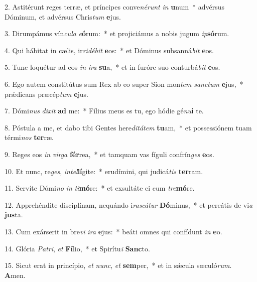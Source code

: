 2. Astitérunt reges terræ, et príncipes conve\textit{né}\textit{runt} \textit{in} \textbf{u}num~*  advérsus Dóminum, et advérsus Chris\textit{tum} \textbf{e}jus.\

3. Dirumpámus vín\textit{cu}\textit{la} \textit{e}\textbf{ó}rum:~*  et projiciámus a nobis jugum \textit{ip}\textbf{só}rum.\

4. Qui hábitat in cælis, ir\textit{ri}\textit{dé}\textit{bit} \textbf{e}os:~*  et Dóminus subsanná\textit{bit} \textbf{e}os.\

5. Tunc loquétur ad eos \textit{in} \textit{i}\textit{ra} \textbf{su}a,~*  et in furóre suo conturbá\textit{bit} \textbf{e}os.\

6. Ego autem constitútus sum Rex ab eo super Sion mon\textit{tem} \textit{sanc}\textit{tum} \textbf{e}jus,~*  prǽdicans præcép\textit{tum} \textbf{e}jus.\

7. Dómi\textit{nus} \textit{di}\textit{xit} \textbf{ad} me:~*  Fílius meus es tu, ego hódie gé\textit{nu}\textbf{i} te.\

8. Póstula a me, et dabo tibi Gentes here\textit{di}\textit{tá}\textit{tem} \textbf{tu}am,~*  et possessiónem tuam térmi\textit{nos} \textbf{ter}ræ.\

9. Reges eos \textit{in} \textit{vir}\textit{ga} \textbf{fér}rea,~*  et tamquam vas fíguli confrín\textit{ges} \textbf{e}os.\

10. Et nunc, re\textit{ges}, \textit{in}\textit{tel}\textbf{lí}gite:~*  erudímini, qui judicá\textit{tis} \textbf{ter}ram.\

11. Servíte Dómi\textit{no} \textit{in} \textit{ti}\textbf{mó}re:~*  et exsultáte ei cum \textit{tre}\textbf{mó}re.\

12. Apprehéndite disciplínam, nequándo i\textit{ras}\textit{cá}\textit{tur} \textbf{Dó}minus,~*  et pereátis de vi\textit{a} \textbf{jus}ta.\

13. Cum exárserit in bre\textit{vi} \textit{i}\textit{ra} \textbf{e}jus:~*  beáti omnes qui confídunt \textit{in} \textbf{e}o.\

14. Glória \textit{Pa}\textit{tri}, \textit{et} \textbf{Fí}lio,~*  et Spirítu\textit{i} \textbf{Sanc}to.\

15. Sicut erat in princípio, \textit{et} \textit{nunc}, \textit{et} \textbf{sem}per,~*  et in sǽcula sæculó\textit{rum}. \textbf{A}men.\

